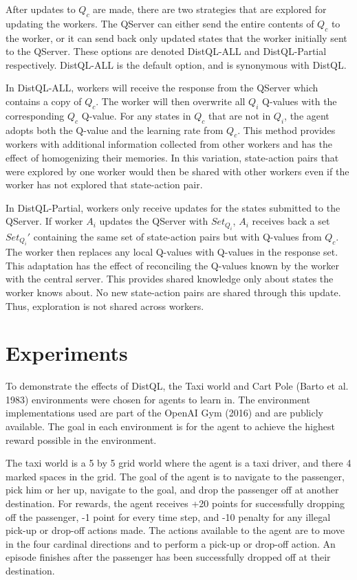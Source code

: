 \documentclass[jair,twoside,11pt,theapa]{article}
\begin{document}
After updates to $Q_c$ are made, there are two strategies that are explored for updating the workers. The QServer can either send the entire contents of $Q_c$ to the worker, or it can send back only updated states that the worker initially sent to the QServer. These options are denoted DistQL-ALL and DistQL-Partial respectively. DistQL-ALL is the default option, and is synonymous with DistQL. 

In DistQL-ALL, workers will receive the response from the QServer which contains a copy of $Q_c$. The worker will then overwrite all $Q_i$ Q-values with the corresponding $Q_c$ Q-value. For any states in $Q_c$ that are not in $Q_i$, the agent adopts both the Q-value and the learning rate from $Q_c$. This method provides workers with additional information collected from other workers and has the effect of homogenizing their memories. In this variation, state-action pairs that were explored by one worker would then be shared with other workers even if the worker has not explored that state-action pair.

In DistQL-Partial, workers only receive updates for the states submitted to the QServer. If worker $A_i$ updates the QServer with $Set_{Q_i}$, $A_i$ receives back a set $Set_{Q_i}'$ containing the same set of state-action pairs but with Q-values from $Q_c$. The worker then replaces any local Q-values with Q-values in the response set. This adaptation has the effect of reconciling the Q-values known by the worker with the central server. This provides shared knowledge only about states the worker knows about. No new state-action pairs are shared through this update. Thus, exploration is not shared across workers. 



\section{Experiments}
\label{experiments}
To demonstrate the effects of DistQL, the Taxi world \cite{Dietterich2000} and Cart Pole (Barto et al. 1983)\nocite{Barto83} environments were chosen for agents to learn in. The environment implementations used are part of the OpenAI Gym (2016) \nocite{gym} and are publicly available. The goal in each environment is for the agent to achieve the highest reward possible in the environment. 

The taxi world is a 5 by 5 grid world where the agent is a taxi driver, and there 4 marked spaces in the grid. The goal of the agent is to navigate to the passenger, pick him or her up, navigate to the goal, and drop the passenger off at another destination. For rewards, the agent receives +20 points for successfully dropping off the passenger, -1 point for every time step, and -10 penalty for any illegal pick-up or drop-off actions made. The actions available to the agent are to move in the four cardinal directions and to perform a pick-up or drop-off action. An episode finishes after the passenger has been successfully dropped off at their destination.
\end{document}
